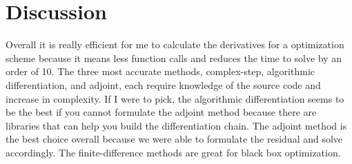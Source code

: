 \documentclass{article}
\begin{document}
\section*{Discussion}

Overall it is really efficient for me to calculate the derivatives for a optimization scheme because it means less function calls and reduces the time to solve by an order of 10. The three most accurate methods, complex-step, algorithmic differentiation, and adjoint, each require knowledge of the source code and increase in complexity. If I were to pick, the algorithmic differentiation seems to be the best if you cannot formulate the adjoint method because there are libraries that can help you build the differentiation chain. The adjoint method is the best choice overall because we were able to formulate the residual and solve accordingly. The finite-difference methods are great for black box optimization. 


%
%
\end{document}
